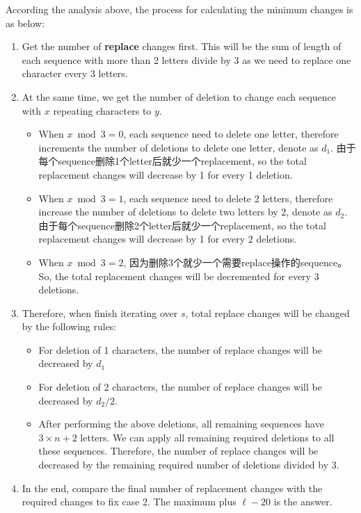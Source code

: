 According the analysis above, the process for calculating the minimum changes is as below:
\begin{enumerate}
\item Get the number of \textbf{replace} changes first. This will be the sum of length of each sequence with more than 2 letters divide by 3 as we need to replace one character every 3 letters. 
\item At the same time, we get the number of deletion to change each sequence with $x$ repeating characters to $y$. 
\begin{itemize}
\item When $x\bmod 3=0$, each sequence need to delete one letter, therefore increments the number of deletions to delete one letter, denote as $d_1$. 由于每个sequence删除1个letter后就少一个replacement, so the total replacement changes will decrease by 1 for every 1 deletion.
\item When $x\bmod 3=1$, each sequence need to delete 2 letters, therefore increase the number of deletions to delete two letters by 2, denote as $d_2$. 由于每个sequence删除2个letter后就少一个replacement, so the total replacement changes will decrease by 1 for every 2 deletions.
\item When $x\bmod 3=2$, 因为删除3个就少一个需要replace操作的sequence。So, the total replacement changes will be decremented for every 3 deletions.
\end{itemize}
\item Therefore, when finish iterating over $s$, total replace changes will be changed by the following rules:
\begin{itemize}
\item For deletion of 1 characters, the number of replace changes will be decreased by $d_1$
\item For deletion of 2 characters, the number of replace changes will be decreased by $d_2 / 2$.
\item After performing the above deletions, all remaining sequences have $3\times n+2$ letters. We can apply all remaining required deletions to all these sequences. Therefore, the number of replace changes will be decreased by the remaining required number of deletions divided by 3.
\end{itemize}
\item In the end, compare the final number of replacement changes with the required changes to fix case 2. The maximum plus $\ell-20$ is the answer. 
\end{enumerate}

